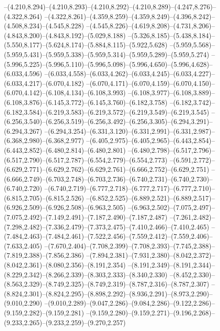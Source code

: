   --(4.210,8.294)--(4.210,8.293)--(4.210,8.292)--(4.210,8.289)--(4.247,8.276)--(4.322,8.264)%
  --(4.322,8.261)--(4.359,8.259)--(4.359,8.249)--(4.396,8.242)--(4.508,8.234)--(4.545,8.228)%
  --(4.545,8.226)--(4.619,8.208)--(4.731,8.206)--(4.843,8.200)--(4.843,8.192)--(5.029,8.188)%
  --(5.326,8.185)--(5.438,8.184)--(5.550,8.177)--(5.624,8.174)--(5.884,8.115)--(5.922,5.628)%
  --(5.959,5.568)--(5.959,5.431)--(5.959,5.338)--(5.959,5.314)--(5.959,5.289)--(5.959,5.274)%
  --(5.996,5.225)--(5.996,5.110)--(5.996,5.098)--(5.996,4.650)--(5.996,4.628)--(6.033,4.596)%
  --(6.033,4.558)--(6.033,4.262)--(6.033,4.245)--(6.033,4.227)--(6.033,4.217)--(6.070,4.182)%
  --(6.070,4.171)--(6.070,4.159)--(6.070,4.150)--(6.070,4.142)--(6.108,4.134)--(6.108,3.993)%
  --(6.108,3.977)--(6.108,3.889)--(6.108,3.876)--(6.145,3.772)--(6.145,3.760)--(6.182,3.758)%
  --(6.182,3.742)--(6.182,3.584)--(6.219,3.583)--(6.219,3.572)--(6.219,3.549)--(6.219,3.545)%
  --(6.256,3.540)--(6.256,3.519)--(6.256,3.492)--(6.256,3.305)--(6.294,3.291)--(6.294,3.267)%
  --(6.294,3.254)--(6.331,3.120)--(6.331,2.991)--(6.331,2.987)--(6.368,2.980)--(6.368,2.977)%
  --(6.405,2.975)--(6.405,2.965)--(6.443,2.854)--(6.443,2.852)--(6.480,2.814)--(6.480,2.801)%
  --(6.480,2.798)--(6.517,2.796)--(6.517,2.790)--(6.517,2.787)--(6.554,2.779)--(6.554,2.773)%
  --(6.591,2.772)--(6.629,2.771)--(6.629,2.762)--(6.629,2.761)--(6.666,2.752)--(6.629,2.751)%
  --(6.666,2.749)--(6.703,2.748)--(6.703,2.736)--(6.740,2.731)--(6.740,2.730)--(6.740,2.720)%
  --(6.740,2.719)--(6.777,2.718)--(6.777,2.717)--(6.777,2.710)--(6.815,2.705)--(6.815,2.526)%
  --(6.852,2.525)--(6.889,2.521)--(6.889,2.517)--(6.926,2.509)--(6.926,2.508)--(6.963,2.505)%
  --(6.963,2.502)--(7.075,2.497)--(7.075,2.492)--(7.149,2.491)--(7.187,2.490)--(7.187,2.487)%
  --(7.261,2.482)--(7.298,2.482)--(7.336,2.479)--(7.373,2.475)--(7.410,2.466)--(7.410,2.465)%
  --(7.484,2.463)--(7.484,2.461)--(7.522,2.456)--(7.559,2.412)--(7.559,2.406)--(7.633,2.405)%
  --(7.670,2.404)--(7.708,2.399)--(7.708,2.393)--(7.745,2.388)--(7.819,2.388)--(7.856,2.386)%
  --(7.894,2.381)--(7.931,2.380)--(8.042,2.372)--(8.042,2.361)--(8.080,2.356)--(8.191,2.354)%
  --(8.191,2.349)--(8.191,2.344)--(8.229,2.342)--(8.266,2.339)--(8.303,2.333)--(8.340,2.330)%
  --(8.452,2.330)--(8.563,2.329)--(8.749,2.325)--(8.749,2.319)--(8.787,2.316)--(8.787,2.307)%
  --(8.824,2.301)--(8.824,2.295)--(8.898,2.292)--(8.936,2.291)--(8.973,2.290)--(9.010,2.290)%
  --(9.010,2.289)--(9.047,2.286)--(9.084,2.286)--(9.122,2.286)--(9.159,2.282)--(9.159,2.281)%
  --(9.159,2.280)--(9.159,2.271)--(9.196,2.268)--(9.233,2.265)--(9.233,2.259)--(9.270,2.257)%
